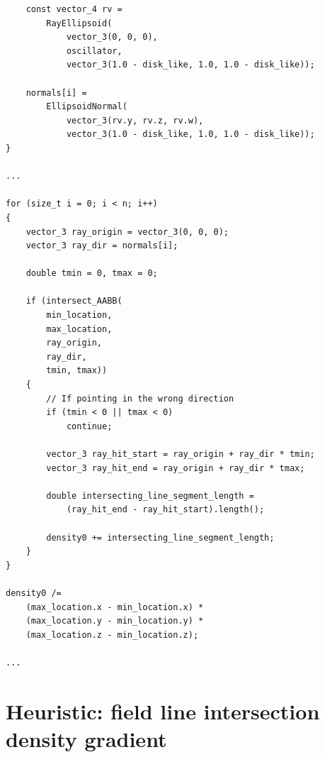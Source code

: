 \documentclass[12pt]{article}
\begin{document}
\begin{lstlisting}
	const vector_4 rv = 
		RayEllipsoid(
			vector_3(0, 0, 0), 
			oscillator, 
			vector_3(1.0 - disk_like, 1.0, 1.0 - disk_like));

	normals[i] = 
		EllipsoidNormal(
			vector_3(rv.y, rv.z, rv.w), 
			vector_3(1.0 - disk_like, 1.0, 1.0 - disk_like));
}

...

for (size_t i = 0; i < n; i++)
{
	vector_3 ray_origin = vector_3(0, 0, 0);
	vector_3 ray_dir = normals[i];

	double tmin = 0, tmax = 0;

	if (intersect_AABB(
		min_location, 
		max_location, 
		ray_origin, 
		ray_dir, 
		tmin, tmax))
	{
		// If pointing in the wrong direction
		if (tmin < 0 || tmax < 0)
			continue;

		vector_3 ray_hit_start = ray_origin + ray_dir * tmin;
		vector_3 ray_hit_end = ray_origin + ray_dir * tmax;

		double intersecting_line_segment_length = 
			(ray_hit_end - ray_hit_start).length();

		density0 += intersecting_line_segment_length;
	}
}

density0 /= 
	(max_location.x - min_location.x) * 
	(max_location.y - min_location.y) * 
	(max_location.z - min_location.z);

...
\end{lstlisting}

\section{Heuristic: field line intersection density gradient}
\end{document}
